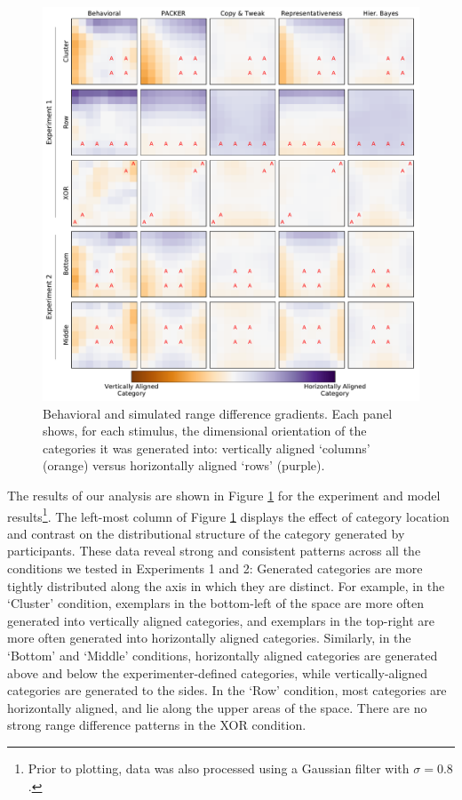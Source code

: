 \documentclass[12pt]{article}
\begin{document}
\begin{flushleft}
\begin{figure}[p]
    \begin{center} 
      \includegraphics[width=\textwidth]{figs/range-diff-gradients.pdf}
      \caption{Behavioral and simulated range difference gradients. Each panel
        shows, for each stimulus, the dimensional orientation of the categories
        it was generated into: vertically aligned `columns' (orange) versus
        horizontally aligned `rows' (purple).}
      \label{fig:range-diff-gradients}
    \end{center}
\end{figure}

The results of our analysis are shown in Figure \ref{fig:range-diff-gradients}
for the experiment and model results\footnote{Prior to plotting, data was also
processed using a Gaussian filter with $\sigma = 0.8$.}. The left-most column of
Figure \ref{fig:range-diff-gradients} displays the effect of category location
and contrast on the distributional structure of the category generated by
participants. These data reveal strong and consistent patterns across all the
conditions we tested in Experiments 1 and 2: Generated categories are more
tightly distributed along the axis in which they are distinct. For example, in
the `Cluster' condition, exemplars in the bottom-left of the space are more
often generated into vertically aligned categories, and exemplars in the
top-right are more often generated into horizontally aligned categories.
Similarly, in the `Bottom' and `Middle' conditions, horizontally aligned
categories are generated above and below the experimenter-defined categories,
while vertically-aligned categories are generated to the sides. In the `Row'
condition, most categories are horizontally aligned, and lie along the upper
areas of the space. There are no strong range difference patterns in the XOR
condition.


\end{flushleft}
\end{document}
